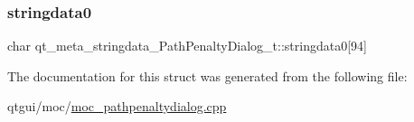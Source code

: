 \subsubsection{\texorpdfstring{stringdata0}{stringdata0}}
{\footnotesize\ttfamily char qt\+\_\+meta\+\_\+stringdata\+\_\+\+Path\+Penalty\+Dialog\+\_\+t\+::stringdata0\mbox{[}94\mbox{]}}



The documentation for this struct was generated from the following file\+:\begin{DoxyCompactItemize}
\item 
qtgui/moc/\mbox{\hyperlink{moc__pathpenaltydialog_8cpp}{moc\+\_\+pathpenaltydialog.\+cpp}}\end{DoxyCompactItemize}
